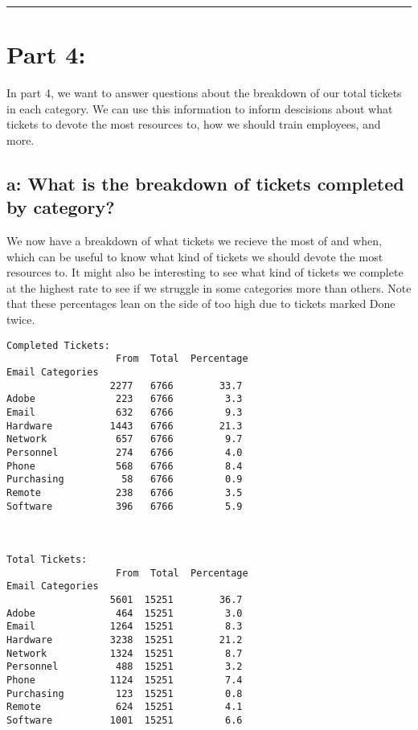 \documentclass[11pt]{article}
\begin{document}
    \begin{center}\rule{0.5\linewidth}{0.5pt}\end{center}

    \hypertarget{part-4}{%
\section{Part 4:}\label{part-4}}

In part 4, we want to answer questions about the breakdown of our total
tickets in each category. We can use this information to inform
descisions about what tickets to devote the most resources to, how we
should train employees, and more.

\hypertarget{a-what-is-the-breakdown-of-tickets-completed-by-category}{%
\subsection{a: What is the breakdown of tickets completed by
category?}\label{a-what-is-the-breakdown-of-tickets-completed-by-category}}

    We now have a breakdown of what tickets we recieve the most of and when,
which can be useful to know what kind of tickets we should devote the
most resources to. It might also be interesting to see what kind of
tickets we complete at the highest rate to see if we struggle in some
categories more than others. Note that these percentages lean on the
side of too high due to tickets marked Done twice.


    \begin{Verbatim}[commandchars=\\\{\}]
Completed Tickets:
                   From  Total  Percentage
Email Categories
                  2277   6766        33.7
Adobe              223   6766         3.3
Email              632   6766         9.3
Hardware          1443   6766        21.3
Network            657   6766         9.7
Personnel          274   6766         4.0
Phone              568   6766         8.4
Purchasing          58   6766         0.9
Remote             238   6766         3.5
Software           396   6766         5.9



Total Tickets:
                   From  Total  Percentage
Email Categories
                  5601  15251        36.7
Adobe              464  15251         3.0
Email             1264  15251         8.3
Hardware          3238  15251        21.2
Network           1324  15251         8.7
Personnel          488  15251         3.2
Phone             1124  15251         7.4
Purchasing         123  15251         0.8
Remote             624  15251         4.1
Software          1001  15251         6.6
    \end{Verbatim}
\end{document}
